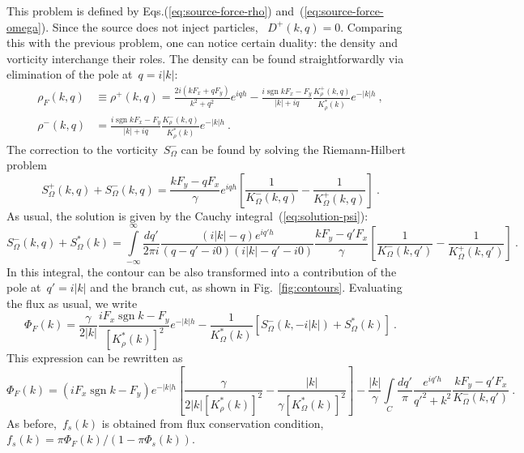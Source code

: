 \documentclass[preprint,aps,eqsecnum]{revtex4-1}
\newcommand{\fplus}[1]{{#1}^{+}}
\newcommand{\fminus}[1]{{#1}^{-}}
\newcommand{\sgn}{\mathop{\mathrm{sgn}}\nolimits}
\begin{document}
This problem is defined by Eqs.(\ref{eq:source-force-rho})
and~(\ref{eq:source-force-omega}). Since the source does not inject particles,
~$\fplus{D}(k, q) = 0$. Comparing this with the previous problem,
one can notice certain duality: the density and vorticity interchange their
roles. The density can be found straightforwardly via elimination of the pole
at~$q = i|k|$:
\begin{align}
  \rho_F(k, q) &\equiv \fplus{\rho}(k, q) = \frac{2i(k F_x + q F_y)}{k^2 + q^2}
  e^{iqh} - \frac{i\sgn k F_x - F_y}{|k| + i q}
   \frac{\fplus{K}_\rho(k, q)}{K_\rho^\ast(k)} e^{-|k|h}
  \ ,
  \\
  \fminus{\rho}(k, q) &= \frac{i\sgn k F_x - F_y}{|k| + iq}
   \frac{\fminus{K}_\rho(k, q)}{K_\rho^\ast(k)} e^{-|k|h}
  \ .
\end{align}
The correction to the vorticity~$\fminus{S}_\Omega$ can be found
 by solving the Riemann-Hilbert problem
\begin{equation}
  \fplus{S}_\Omega(k, q) + \fminus{S}_\Omega(k, q) =
  \frac{k F_y - qF_x}{\gamma} e^{iqh} \left[\frac{1}{\fminus{K}_\Omega(k, q)}
   - \frac{1}{\fplus{K}_\Omega(k, q)} \right]
  \ .
\end{equation}
 As usual, the solution is given
by the Cauchy integral~(\ref{eq:solution-psi}):
\begin{equation}
  \fminus{S}_\Omega(k, q) + S_\Omega^\ast(k) =  \int\limits_{-\infty}^{\infty}
  \frac{dq'}{2\pi i}
  \frac{(i|k| - q) e^{iq'h}}{(q - q' - i0)(i|k| - q' - i0)}
  \frac{k F_y - q'F_x}{\gamma}
  \left[\frac{1}{\fminus{K}_\Omega(k, q')}
            - \frac{1}{\fplus{K}_\Omega(k, q')}\right]
  \ .
\end{equation}
In this integral, the contour can be also transformed into a contribution of
the pole at~$q' = i |k|$ and the branch cut, as shown in Fig.~\ref{fig:contours}.
Evaluating the flux as usual, we write
\begin{equation}
  \Phi_F(k) = \frac{\gamma}{2|k|}\frac{i F_x \sgn k - F_y}{\left[K_\rho^\ast(k)\right]^2}
  e^{-|k| h} - \frac{1}{K_\Omega^\ast(k)} \left[\fminus{S}_\Omega(k, -i|k|) + S_\Omega^\ast(k)\right]
  \ .
\end{equation}
This expression can be rewritten as
\begin{equation}
  \Phi_F(k) =  (i F_x \sgn k - F_y)e^{-|k|h}
  \left[\frac{\gamma}{2|k|\left[K_\rho^\ast(k)\right]^2} - \frac{|k|}{\gamma\left[K_\Omega^\ast(k)\right]^2 }\right]
  -  \frac{|k|}{\gamma}\int\limits_C \frac{dq'}{\pi} \frac{e^{iq'h}}{q'^2 + k^2}
     \frac{k F_y - q'F_x}{\fminus{K}_\Omega(k, q')}
     \ .
\end{equation}
As before,~$f_s(k)$ is obtained from flux conservation condition,
$f_s(k) = \pi \Phi_F(k)/(1 - \pi \Phi_s(k))$.
\end{document}
